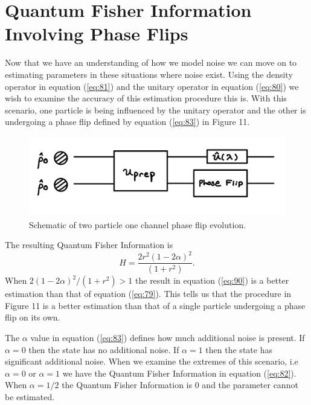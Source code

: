 \documentclass[twocolumn]{article}
\begin{document}
\section*{Quantum Fisher Information Involving Phase Flips}
Now that we have an understanding of how we model noise we can move on to estimating parameters in these situations where noise exist. Using the density operator in equation (\ref{eq:81}) and the unitary operator in equation (\ref{eq:80}) we wish to examine the accuracy of this estimation procedure this is. With this scenario, one particle is being influenced by the unitary operator and the other is undergoing a phase flip defined by equation (\ref{eq:83}) in Figure 11. 
\begin{figure}[htpb]
\begin{center}
\includegraphics[width=0.90\linewidth]{Two-Particle-Phase-Flip.jpg}
\caption{Schematic of two particle one channel phase flip evolution.}
\end{center}
\end{figure}
\newpage
The resulting Quantum Fisher Information is
\begin{equation}\label{eq:90}
H=\frac{2r^2(1-2\alpha)^2}{(1+r^2)}.
\end{equation}
When $2(1-2\alpha)^2/(1+r^2)>1$ the result in equation (\ref{eq:90}) is a better estimation than that of equation (\ref{eq:79}). This tells us that the procedure in Figure 11 is a better estimation than that of a single particle undergoing a phase flip on its own.

The $\alpha$ value in equation (\ref{eq:83}) defines how much additional noise is present. If $\alpha=0$ then the state has no additional noise. If $\alpha=1$ then the state has significant additional noise. When we examine the extremes of this scenario, i.e $\alpha=0$ or $\alpha=1$ we have the Quantum Fisher Information in equation (\ref{eq:82}). When $\alpha=1/2$ the Quantum Fisher Information is 0 and the parameter cannot be estimated.
\end{document}
